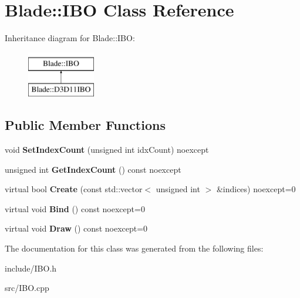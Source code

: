 \hypertarget{class_blade_1_1_i_b_o}{}\section{Blade\+:\+:I\+BO Class Reference}
\label{class_blade_1_1_i_b_o}
Inheritance diagram for Blade\+:\+:I\+BO\+:\begin{figure}[H]
\begin{center}
\leavevmode
\includegraphics[height=2.000000cm]{class_blade_1_1_i_b_o}
\end{center}
\end{figure}
\subsection*{Public Member Functions}
\begin{DoxyCompactItemize}
\item 
\mbox{\label{class_blade_1_1_i_b_o_a46e02fdc0e86623d6fbf46a4b7e378d5}} 
void {\bfseries Set\+Index\+Count} (unsigned int idx\+Count) noexcept
\item 
\mbox{\label{class_blade_1_1_i_b_o_a2599c509e9f6d5e6428e49c38f64e83d}} 
unsigned int {\bfseries Get\+Index\+Count} () const noexcept
\item 
\mbox{\label{class_blade_1_1_i_b_o_afde98cb5cae94bc2f617c74a9fcd5cfe}} 
virtual bool {\bfseries Create} (const std\+::vector$<$ unsigned int $>$ \&indices) noexcept=0
\item 
\mbox{\label{class_blade_1_1_i_b_o_a1ce875cb7ed5345b64f693908c9a71a4}} 
virtual void {\bfseries Bind} () const noexcept=0
\item 
\mbox{\label{class_blade_1_1_i_b_o_ad7875a9e8513fe7f7e20919faa4b5ef3}} 
virtual void {\bfseries Draw} () const noexcept=0
\end{DoxyCompactItemize}


The documentation for this class was generated from the following files\+:\begin{DoxyCompactItemize}
\item 
include/I\+B\+O.\+h\item 
src/I\+B\+O.\+cpp\end{DoxyCompactItemize}
